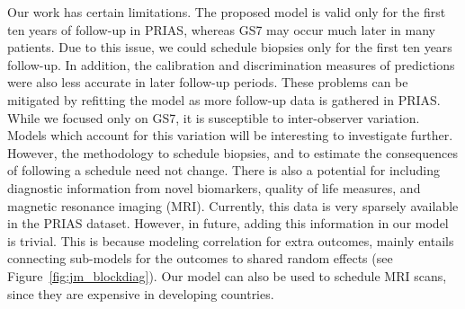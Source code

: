 Our work has certain limitations. The proposed model is valid only for the first ten years of follow-up in PRIAS, whereas GS7 may occur much later in many patients. Due to this issue, we could schedule biopsies only for the first ten years follow-up. In addition, the calibration and discrimination measures of predictions were also less accurate in later follow-up periods. These problems can be mitigated by refitting the model as more follow-up data is gathered in PRIAS. While we focused only on GS7, it is susceptible to inter-observer variation. Models which account for this variation \citep{coley2017prediction,balasubramanian2003estimation} will be interesting to investigate further. However, the methodology to schedule biopsies, and to estimate the consequences of following a schedule need not change. There is also a potential for including diagnostic information from novel biomarkers, quality of life measures, and magnetic resonance imaging (MRI). Currently, this data is very sparsely available in the PRIAS dataset. However, in future, adding this information in our model is trivial. This is because modeling correlation for extra outcomes, mainly entails connecting sub-models for the outcomes to shared random effects (see Figure~\ref{fig:jm_blockdiag}). Our model can also be used to schedule MRI scans, since they are expensive in developing countries.